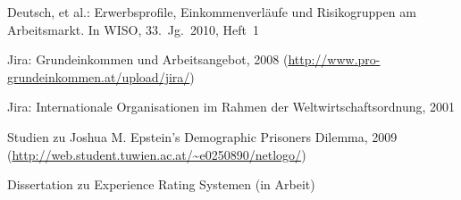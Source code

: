 

	
	{\begin{cvenumerate}
		\item Deutsch, et al.: Erwerbsprofile, Einkommenverläufe
		und Risikogruppen am Arbeitsmarkt. In WISO, 33.~Jg.~2010, Heft~1
		\item Jira: Grundeinkommen und Arbeitsangebot, 2008\newline
		(\href{http://www.pro-grundeinkommen.at/upload/jira/}{http://www.pro-grundeinkommen.at/upload/jira/})
		\item Jira: Internationale Organisationen im Rahmen der
		Weltwirtschaftsordnung, 2001
	\end{cvenumerate}}

	{\begin{cvenumerate}
		\item Studien zu Joshua M. Epstein's Demographic Prisoners Dilemma,
		2009\newline
		(\href{http://web.student.tuwien.ac.at/~e0250890/netlogo/}{http://web.student.tuwien.ac.at/\textasciitilde{}e0250890/netlogo/})
		\item Dissertation zu Experience Rating Systemen (in Arbeit)
	\end{cvenumerate}}